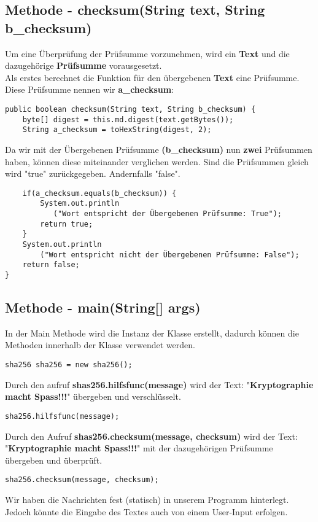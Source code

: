 \documentclass[12pt]{article}
\begin{document}
\subsection{Methode - checksum(String text, String b\_checksum)}
Um eine Überprüfung der Prüfsumme vorzunehmen, wird ein \textbf{Text} und die dazugehörige \textbf{Prüfsumme} vorausgesetzt.\\
Als erstes berechnet die Funktion für den übergebenen \textbf{Text} eine Prüfsumme. Diese Prüfsumme nennen wir \textbf{a\_checksum}:
\begin{lstlisting}
public boolean checksum(String text, String b_checksum) {
	byte[] digest = this.md.digest(text.getBytes());
	String a_checksum = toHexString(digest, 2);
\end{lstlisting}
Da wir mit der Übergebenen Prüfsumme \textbf{(b\_checksum)} nun \textbf{zwei} Prüfsummen haben, können diese miteinander verglichen werden.
Sind die Prüfsummen gleich wird "true" zurückgegeben. Andernfalls "false".
\begin{lstlisting}
	if(a_checksum.equals(b_checksum)) {
	    System.out.println
	       ("Wort entspricht der Übergebenen Prüfsumme: True");
		return true;
	}
	System.out.println
	    ("Wort entspricht nicht der Übergebenen Prüfsumme: False");
	return false;
}
\end{lstlisting}

\subsection{Methode - main(String[] args)}
In der Main Methode wird die Instanz der Klasse erstellt, dadurch können die Methoden innerhalb der Klasse verwendet werden.
\begin{lstlisting}
sha256 sha256 = new sha256();
\end{lstlisting}
Durch den aufruf \textbf{shas256.hilfsfunc(message)} wird der Text: "\textbf{Kryptographie macht Spass!!!}" übergeben und verschlüsselt.
\begin{lstlisting}
sha256.hilfsfunc(message);
\end{lstlisting}
Durch den Aufruf \textbf{shas256.checksum(message, checksum)} wird der Text:\\
"\textbf{Kryptographie macht Spass!!!}" mit der dazugehörigen Prüfsumme übergeben und überprüft.
\begin{lstlisting}
sha256.checksum(message, checksum);
\end{lstlisting}
Wir haben die Nachrichten fest (statisch) in unserem Programm hinterlegt. Jedoch könnte die Eingabe des Textes auch von einem User-Input erfolgen.
\newpage
\end{document}
